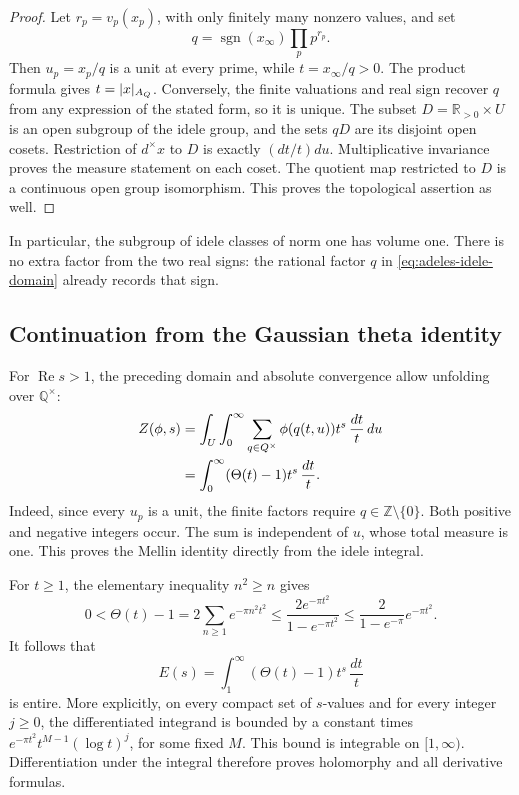 \begin{proof}
Let \(r_p=v_p(x_p)\), with only finitely many nonzero values, and set
\[
 q=\operatorname{sgn}(x_\infty)\prod_p p^{r_p}.
\]
Then \(u_p=x_p/q\) is a unit at every prime, while
\(t=x_\infty/q>0\). The product formula gives
\(t=|x|_{\Adele}\). Conversely, the finite valuations and real sign recover
\(q\) from any expression of the stated form, so it is unique.
The subset \(D=\mathbb R_{>0}\times U\) is an open subgroup of the
idele group, and the sets \(qD\) are its disjoint open cosets.
Restriction of \(d^{\times} x\) to \(D\) is exactly \((dt/t)du\).
Multiplicative invariance proves the measure statement on each coset.
The quotient map restricted to \(D\) is a continuous open group
isomorphism. This proves the topological assertion as well.
\end{proof}

In particular, the subgroup of idele classes of norm one has volume one.
There is no extra factor from the two real signs: the rational factor
\(q\) in \eqref{eq:adeles-idele-domain} already records that sign.

\subsection{Continuation from the Gaussian theta identity}
\label{sec:adeles-continuation}

For \(\operatorname{Re}s>1\), the preceding domain and absolute convergence
allow unfolding over \(\mathbb Q^\times\):
\begin{align}
 Z(\phi,s)
 &=\int_U\int_0^\infty
      \sum_{q\in\mathbb Q^\times}\phi(q(t,u))t^s\,\frac{dt}{t}\,du
 \notag\\
 &=\int_0^\infty(\Theta(t)-1)t^s\,\frac{dt}{t}.
 \label{eq:adeles-mellin-theta}
\end{align}
Indeed, since every \(u_p\) is a unit, the finite factors require
\(q\in\mathbb Z\setminus\{0\}\). Both positive and negative integers
occur. The sum is independent of \(u\), whose total measure is one.
This proves the Mellin identity directly from the idele integral.

For \(t\geq1\), the elementary inequality \(n^2\geq n\) gives
\begin{equation}
 0<\Theta(t)-1
 =2\sum_{n\geq1}e^{-\pi n^2t^2}
 \leq\frac{2e^{-\pi t^2}}{1-e^{-\pi t^2}}
 \leq\frac{2}{1-e^{-\pi}}e^{-\pi t^2}.
 \label{eq:adeles-theta-bound}
\end{equation}
It follows that
\[
 E(s)=\int_1^\infty(\Theta(t)-1)t^s\,\frac{dt}{t}
\]
is entire. More explicitly, on every compact set of \(s\)-values and for
every integer \(j\geq0\), the differentiated integrand is bounded by
a constant times \(e^{-\pi t^2}t^{M-1}(\log t)^j\), for some fixed
\(M\). This bound is integrable on \([1,\infty)\). Differentiation under
the integral therefore proves holomorphy and all derivative formulas.

